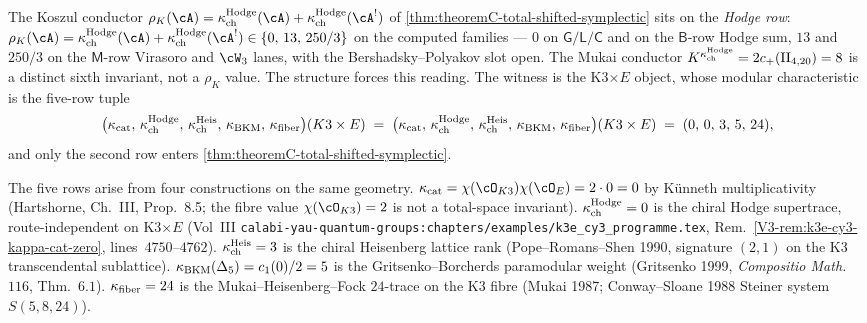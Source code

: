 \begin{remark}
\label{rem:theoremC-K3E-kappa-tuple-witness}
%
%
The Koszul conductor $\rho_K(\cA) = \kappaChHodge(\cA) + \kappaChHodge(\cA^!)$
of \cref{thm:theoremC-total-shifted-symplectic} sits on the
\emph{Hodge row}: $\rho_K(\cA) = \kappaChHodge(\cA) +
\kappaChHodge(\cA^!) \in \{0,\, 13,\, 250/3\}$ on the computed
families — $0$ on $\mathsf{G/L/C}$ and on the $\mathsf{B}$-row
Hodge sum, $13$ and $250/3$ on the $\mathsf{M}$-row Virasoro and
$\cW_3$ lanes, with the Bershadsky--Polyakov slot open. The Mukai
conductor $K^{\kappa_{\mathrm{ch}}^{\mathrm{Hodge}}} = 2c_+(\mathrm{II}_{4,20}) = 8$ is a distinct
sixth invariant, not a $\rho_K$ value. The structure forces
this reading. The witness is the K3$\times E$ object, whose
modular characteristic is the five-row tuple
\[
 \bigl(\kappa_{\mathrm{cat}},\, \kappa_{\mathrm{ch}}^{\mathrm{Hodge}},\, \kappa_{\mathrm{ch}}^{\mathrm{Heis}},\, \kappa_{\mathrm{BKM}},\, \kappa_{\mathrm{fiber}}\bigr)(K3 \times E)
 \;=\;
 \bigl(\kappa_{\mathrm{cat}},\, \kappa_{\mathrm{ch}}^{\mathrm{Hodge}},\, \kappa_{\mathrm{ch}}^{\mathrm{Heis}},\, \kappa_{\mathrm{BKM}},\, \kappa_{\mathrm{fiber}}\bigr)(K3 \times E)
 \;=\;
 (0,\, 0,\, 3,\, 5,\, 24),
\]
and only the second row enters
\cref{thm:theoremC-total-shifted-symplectic}.

The five rows arise from four constructions on the same geometry.
$\kappaCat = \chi(\cO_{K3}) \chi(\cO_E) = 2 \cdot 0 = 0$ by
K\"unneth multiplicativity (Hartshorne, Ch.~III, Prop.~8.5; the
fibre value $\chi(\cO_{K3}) = 2$ is not a total-space invariant).
$\kappa_{\mathrm{ch}}^{\mathrm{Hodge}} = 0$ is the chiral Hodge supertrace,
route-independent on K3$\times E$ (Vol~III
\texttt{calabi-yau-quantum-groups:chapters/examples/k3e\_cy3\_programme.tex},
Rem.~\ref*{V3-rem:k3e-cy3-kappa-cat-zero}, lines~$4750$--$4762$).
$\kappa_{\mathrm{ch}}^{\mathrm{Heis}} = 3$ is the chiral Heisenberg lattice rank
(Pope--Romans--Shen 1990, signature $(2, 1)$ on the K3
transcendental sublattice).
$\kappa_{\mathrm{BKM}}(\Delta_5) = c_1(0)/2 = 5$ is the
Gritsenko--Borcherds paramodular weight (Gritsenko 1999,
\emph{Compositio Math.}~$116$, Thm.~$6.1$).
$\kappa_{\mathrm{fiber}} = 24$ is the Mukai--Heisenberg--Fock $24$-trace on
the K3 fibre (Mukai 1987; Conway--Sloane 1988 Steiner system
$S(5, 8, 24)$).


\end{remark}
